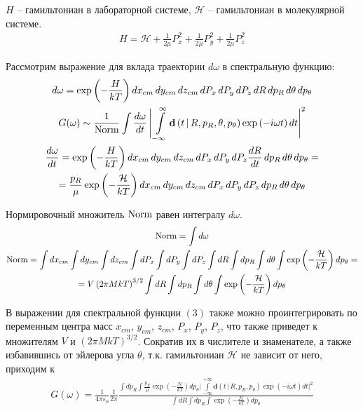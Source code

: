 \documentclass[14pt]{extarticle}
\newcommand{\lb}{\left(}
\newcommand{\rb}{\right)}
\newcommand{\tp}{\textup}
\newcommand{\mH}{\mathcal{H}}
\newcommand{\dv}{\mathbf{d}}
\begin{document}
$H$ -- гамильтониан в лабораторной системе, $\mH$ -- гамильтониан в молекулярной системе.
\begin{gather}
	H = \mH + \frac{1}{2 \mu} P_x^2 + \frac{1}{2 \mu} P_y^2 + \frac{1}{2 \mu} P_z^2
\end{gather}

Рассмотрим выражение для вклада траектории $d \omega$ в спектральную функцию: 
\begin{gather}
		d \omega = \exp \lb - \frac{H}{k T} \rb dx_{cm} \, dy_{cm} \, dz_{cm} \, d P_x \, dP_y \, dP_z \, d R \, d p_R \, d \theta \, d p_\theta \\
G( \omega ) \sim \frac{1}{\tp{Norm}} \int \frac{d \omega}{d t} \, \Biggl \rvert \, \int\limits_{-\infty}^{\infty} \dv \lb t \, | \, R, p_R, \theta, p_\theta \rb \exp \lb - i \omega t \rb dt \Biggr \rvert^2 \\
	\frac{d \omega}{d t} = \exp \lb - \frac{H}{k T} \rb d x_{cm} \, d y_{cm} \, d z_{cm} \, dP_x \, dP_y \, dP_z \frac{d R}{d t} \, d p_R \, d \theta \, d p_\theta = \\ 
	= \frac{p_R}{\mu} \exp \lb - \frac{\mH}{kT} \rb d x_{cm} \, dy_{cm} \, dz_{cm} \, dP_x \, dP_y \, dP_z \, d p_R \, d \theta \, d p_\theta
\end{gather}

Нормировочный множитель $\tp{Norm}$ равен интегралу $d \omega$. 
\begin{gather}
	\tp{Norm} = \int d \omega \\ 
	\tp{Norm} = \int dx_{cm} \int dy_{cm} \int dz_{cm} \int dP_x \int dP_y \int dP_z \int d R \int d p_R \int d \theta \int \exp \lb - \frac{\mH}{k T} \rb d p_\theta = \notag \\
	= V \lb 2 \pi M k T \rb^{3/2} \int dR \int dp_R \int d\theta \int \exp \lb - \frac{\mH}{kT} \rb d p_\theta
\end{gather}

В выражении для спектральной функции $(3)$ также можно проинтегрировать по переменным центра масс $x_{cm}$, $y_{cm}$, $z_{cm}$, $P_x$, $P_y$, $P_z$, что также приведет к множителям $V$ и $\lb 2 \pi M k T \rb^{3/2}$. Сократив их в числителе и знаменателе, а также избавившись от эйлерова угла $\theta$, т.к. гамильтониан $\mH$ не зависит от него, приходим к
\begin{gather}
	G( \omega ) = \frac{1}{4 \pi \varepsilon_0} \frac{1}{2 \pi} \frac{ \displaystyle \int dp_R \int \frac{p_R}{\mu} \exp \lb - \frac{\mH}{k T} \rb d p_\theta \Biggl \rvert \, \int\limits_{-\infty}^{+\infty} \dv \lb t \, | \, R, p_R, p_\theta \rb \exp \lb -i \omega t \rb dt \Biggr \rvert^2 }
	{\displaystyle \int dR \int dp_R  \int \exp \lb -\frac{\mH}{kT} \rb d p_\theta } 
\end{gather}
\end{document}
